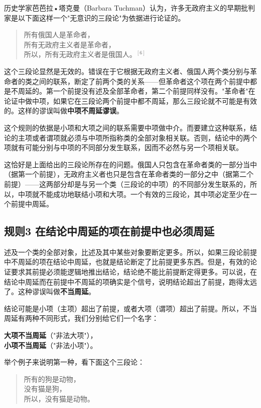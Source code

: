 历史学家芭芭拉•塔克曼（Barbara Tuchman）认为，许多无政府主义的早期批判家是以下面这样一个"无意识的三段论"为依据进行论证的。

\begin{quote}
所有俄国人是革命者，\\
所有无政府主义者是革命者，\\
所以，所有无政府主义者是俄国人。$^{[6]}$
\end{quote}

这个三段论显然是无效的。错误在于它根据无政府主义者、俄国人两个类分别与革命者的类之间的联系，断定了前两个类的关系——但革命者这个项在两个前提中都是不周延的。第一个前提没有述及全部革命者，第二个前提同样没有。"革命者"在论证中做中项，如果它在三段论两个前提中都不周延，那么三段论就不可能是有效的。这样的谬误叫做\textbf{中项不周延谬误}。

这个规则的依据是小项和大项之间的联系需要中项做中介。而要建立这种联系，结论的主项或者谓项就必须与中项所指称类的全部对象相关联。否则，结论中的两个项就有可能分别与中项的不同部分发生联系，因而不必然与另一个项相关联。

这恰好是上面给出的三段论所存在的问题。俄国人只包含在革命者类的一部分当中（据第一个前提），无政府主义者也只是包含在革命者类的一部分之中（据第二个前提）——这两部分却是与另一个类（三段论的中项）的不同部分发生联系的，所以，中项就不能成功地联结小项和大项。一个有效的三段论，其中项必定至少在一个前提中周延。

\subsection{规则3 在结论中周延的项在前提中也必须周延}
述及一个类的全部对象，比述及其中某些对象要断定更多。所以，如果三段论前提中不周延的项在结论中周延，也就是结论断定了比前提更多东西。但是，有效的论证要求其前提必须能逻辑地推出结论，结论绝不能比前提断定得更多。可以说，在结论中周延而在前提中不周延的项确实是个信号，说明结论超出了前提，跑得太远了。这种谬误叫做\textbf{不当周延}。

结论可能是小项（主项）超出了前提，或者大项（谓项）超出了前提。所以，不当周延有两种不同形式，我们分别给它们一个名字：

\textbf{大项不当周延}（"非法大项"），\\
\textbf{小项不当周延}（"非法小项"）。

举个例子来说明第一种，看下面这个三段论：

\begin{quote}
所有的狗是动物，\\
没有猫是狗，\\
所以，没有猫是动物。
\end{quote}

